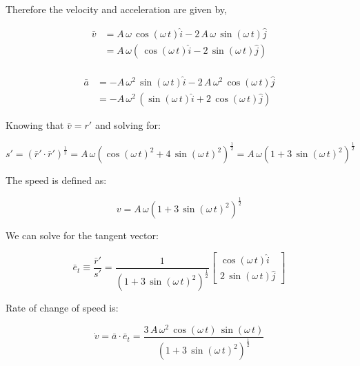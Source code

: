 \documentclass[12pt, letterpaper]{../assignment}
\begin{document}
Therefore the velocity and acceleration are given by,

\begin{equation*}
   \begin{aligned}
       \bar{v} &= A\,\omega \,\cos\left(\omega \,t\right)\hat{i}-2\,A\,\omega \,\sin\left(\omega \,t\right)\hat{j}\\
       &= A\,\omega\left( \,\cos\left(\omega \,t\right)\hat{i}-2 \,\sin\left(\omega \,t\right)\hat{j}\right)\\
   \end{aligned}
\end{equation*}

\begin{equation*}
   \begin{aligned}
       \bar{a} &= -A\,\omega ^2\,\sin\left(\omega \,t\right)\hat{i} -2\,A\,\omega ^2\,\cos\left(\omega \,t\right)\hat{j}\\
       &= -A\,\omega ^2\,\left(\sin\left(\omega \,t\right)\hat{i}+2\,\cos\left(\omega \,t\right)\hat{j}\right)
   \end{aligned}
\end{equation*}

Knowing that $\bar{v} = r'$ and solving for:

$$ s' = \left( \bar{r}' \cdot \bar{r}' \right)^\frac{1}{2} = A\,\omega \left( {\cos\left(\omega \,t\right)}^2+4\,{\sin\left(\omega \,t\right)}^2 \right)^\frac{1}{2}
= A\,\omega \left( 1+3\,{\sin\left(\omega \,t\right)}^2 \right)^\frac{1}{2}$$

The speed is defined as:

\begin{answer}
$$ v = A\,\omega \left( 1+3\,{\sin\left(\omega \,t\right)}^2 \right)^\frac{1}{2} $$
\end{answer}

We can solve for the tangent vector:

$$ \bar{e}_t  \equiv \frac{\bar{r}'}{s'} = \frac{1}{{\left(1+ 3\,{\sin\left(\omega \,t\right)}^2\right)}^\frac{1}{2}}
\left[\begin{array}{c} {\cos\left(\omega \,t\right)} \hat{i}\\ {2\,\sin\left(\omega \,t\right)}\hat{j} \end{array}\right]$$

Rate of change of speed is:

\begin{answer}
$$ \dot{v} = \bar{a} \cdot \bar{e}_t =
\frac{3\,A\,\omega ^2\,\cos\left(\omega \,t\right)\,\sin\left(\omega \,t\right)}{{\left(1+ 3\,{\sin\left(\omega \,t\right)}^2\right)}^\frac{1}{2}}$$
\end{answer}
\end{document}
